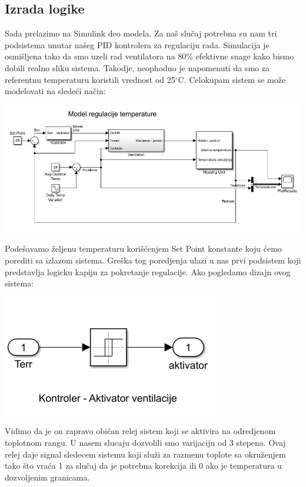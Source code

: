 \documentclass[a4paper,11pt]{book}
\begin{document}
\subsection{Izrada logike}

Sada prelazimo na Simulink deo modela. Za naš slučaj potrebna su nam tri podsistema unutar našeg PID kontrolera za regulaciju rada. Simulacija je osmišljena tako da smo uzeli rad ventilatora na 80$\%$ efektivne snage kako bismo dobili realno sliku sistema. Takodje, neophodno je napomenuti da smo za referentnu temperaturu koristili vrednost od 25$^\circ$C. Celokupam sistem se može modelovati na sledeći način:

\includegraphics[width=\textwidth]{ceo.png}

Podešavamo željenu temperaturu korišćenjem Set Point konstante koju ćemo porediti sa izlazom sistema. Greška tog poredjenja ulazi u nas prvi podsistem koji predstavlja logicku kapiju za pokretanje regulacije. Ako pogledamo dizajn ovog sistema:

\includegraphics[width=\textwidth]{kont.png}

Vidimo da je on zapravo običan relej sistem koji se aktivira na odredjenom toplotnom rangu. U nasem slucaju dozvolili smo varijaciju od 3 stepena. Ovaj relej daje signal sledecem sistemu koji služi za razmenu toplote sa okruženjem tako što vraća 1 za slučaj da je potrebna korekcija ili 0 ako je temperatura u dozvoljenim granicama.
\end{document}
